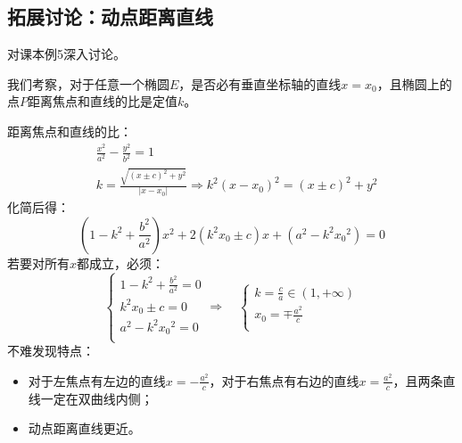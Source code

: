 \subsection{拓展讨论：动点距离直线}

\begin{tcolorbox}
对课本例5深入讨论。
\end{tcolorbox}

我们考察，对于任意一个椭圆$E$，是否必有垂直坐标轴的直线$x=x_0$，且椭圆上的点$P$距离焦点和直线的比是定值$k$。

\begin{figure}[h]
\centering
{}
\end{figure}

距离焦点和直线的比：
\begin{align*}
&\frac{x^2}{a^2}-\frac{y^2}{b^2}=1 \\
&k=\frac{\sqrt{\left( x\pm c \right) ^2+y^2}}{\left| x-x_0 \right|}\Rightarrow k^2\left( x-x_0 \right) ^2=\left( x\pm c \right) ^2+y^2
\end{align*}
化简后得：
\[
\left( 1-k^2+\frac{b^2}{a^2} \right) x^2+2\left( k^2x_0\pm c \right) x+\left( a^2-k^2{x_0}^2 \right) =0
\]
若要对所有$x$都成立，必须：
\[
\begin{cases}
	1-k^2+\frac{b^2}{a^2}=0\\
	k^2x_0\pm c=0\\
	a^2-k^2{x_0}^2=0\\
\end{cases}\Rightarrow \quad \begin{cases}
	k=\frac{c}{a}\in \left( 1,+\infty \right) \\
	x_0=\mp \frac{a^2}{c}\\
\end{cases}
\]
不难发现特点：
\begin{itemize}
    \item 对于左焦点有左边的直线$x=-\frac{a^2}{c}$，对于右焦点有右边的直线$x=\frac{a^2}{c}$，且两条直线一定在双曲线内侧；
    \item 动点距离直线更近。
\end{itemize}

